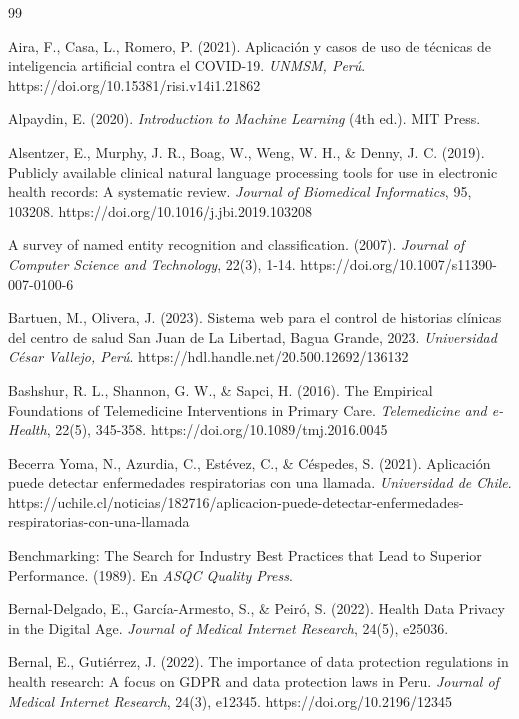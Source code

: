 \documentclass[12pt,a4paper]{article}
\begin{document}
\begin{thebibliography}{99}

Aira, F., Casa, L., Romero, P. (2021). Aplicación y casos de uso de técnicas de inteligencia artificial contra el COVID-19. \textit{UNMSM, Perú}. https://doi.org/10.15381/risi.v14i1.21862

Alpaydin, E. (2020). \textit{Introduction to Machine Learning} (4th ed.). MIT Press.

Alsentzer, E., Murphy, J. R., Boag, W., Weng, W. H., \& Denny, J. C. (2019). Publicly available clinical natural language processing tools for use in electronic health records: A systematic review. \textit{Journal of Biomedical Informatics}, 95, 103208. https://doi.org/10.1016/j.jbi.2019.103208

A survey of named entity recognition and classification. (2007). \textit{Journal of Computer Science and Technology}, 22(3), 1-14. https://doi.org/10.1007/s11390-007-0100-6

Bartuen, M., Olivera, J. (2023). Sistema web para el control de historias clínicas del centro de salud San Juan de La Libertad, Bagua Grande, 2023. \textit{Universidad César Vallejo, Perú}. https://hdl.handle.net/20.500.12692/136132

Bashshur, R. L., Shannon, G. W., \& Sapci, H. (2016). The Empirical Foundations of Telemedicine Interventions in Primary Care. \textit{Telemedicine and e-Health}, 22(5), 345-358. https://doi.org/10.1089/tmj.2016.0045

Becerra Yoma, N., Azurdia, C., Estévez, C., \& Céspedes, S. (2021). Aplicación puede detectar enfermedades respiratorias con una llamada. \textit{Universidad de Chile}. https://uchile.cl/noticias/182716/aplicacion-puede-detectar-enfermedades-respiratorias-con-una-llamada

Benchmarking: The Search for Industry Best Practices that Lead to Superior Performance. (1989). En \textit{ASQC Quality Press}.

Bernal-Delgado, E., García-Armesto, S., \& Peiró, S. (2022). Health Data Privacy in the Digital Age. \textit{Journal of Medical Internet Research}, 24(5), e25036.

Bernal, E., Gutiérrez, J. (2022). The importance of data protection regulations in health research: A focus on GDPR and data protection laws in Peru. \textit{Journal of Medical Internet Research}, 24(3), e12345. https://doi.org/10.2196/12345


\end{thebibliography}
\end{document}
